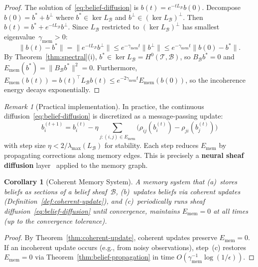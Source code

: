 \documentclass[11pt,a4paper]{article}
\theoremstyle{plain}
\newtheorem{corollary}[theorem]{Corollary}
\theoremstyle{definition}
\theoremstyle{remark}
\newtheorem{remark}[theorem]{Remark}
\newcommand{\cT}{\mathcal{T}}
\newcommand{\cB}{\mathcal{B}}
\begin{document}
\begin{proof}
The solution of~\eqref{eq:belief-diffusion} is $b(t) = e^{-tL_\cB}b(0)$. Decompose $b(0) = b^* + b^\perp$ where $b^* \in \ker L_\cB$ and $b^\perp \in (\ker L_\cB)^\perp$. Then $b(t) = b^* + e^{-tL_\cB}b^\perp$. Since $L_\cB$ restricted to $(\ker L_\cB)^\perp$ has smallest eigenvalue~$\gamma_{\mathrm{mem}} > 0$:
\[
\|b(t) - b^*\| = \|e^{-tL_\cB}b^\perp\| \leq e^{-\gamma_{\mathrm{mem}} t}\|b^\perp\| \leq e^{-\gamma_{\mathrm{mem}} t}\|b(0) - b^*\|.
\]
By Theorem~\ref{thm:spectral}(i), $b^* \in \ker L_\cB = H^0(\cT, \cB)$, so $B_\cB b^* = 0$ and $E_{\mathrm{mem}}(b^*) = \|B_\cB b^*\|^2 = 0$. Furthermore, $E_{\mathrm{mem}}(b(t)) = b(t)^\top L_\cB b(t) \leq e^{-2\gamma_{\mathrm{mem}} t} E_{\mathrm{mem}}(b(0))$, so the incoherence energy decays exponentially.
\end{proof}

\begin{remark}[Practical implementation]\label{rem:belief-practice}
In practice, the continuous diffusion~\eqref{eq:belief-diffusion} is discretized as a message-passing update:
\[
b_i^{(t+1)} = b_i^{(t)} - \eta \sum_{j: (i,j) \in E_{\mathrm{mem}}} \bigl(\rho_{ij}(b_i^{(t)}) - \rho_{ji}(b_j^{(t)})\bigr)
\]
with step size $\eta < 2/\lambda_{\max}(L_\cB)$ for stability. Each step reduces $E_{\mathrm{mem}}$ by propagating corrections along memory edges. This is precisely a \textbf{neural sheaf diffusion} layer~\citep{bodnar2022} applied to the memory graph.
\end{remark}

\begin{corollary}[Coherent Memory System]\label{cor:memory-system}
A memory system that (a)~stores beliefs as sections of a belief sheaf~$\cB$, (b)~updates beliefs via coherent updates (Definition~\ref{def:coherent-update}), and (c)~periodically runs sheaf diffusion~\eqref{eq:belief-diffusion} until convergence, maintains $E_{\mathrm{mem}} = 0$ at all times (up to the convergence tolerance).
\end{corollary}

\begin{proof}
By Theorem~\ref{thm:coherent-update}, coherent updates preserve $E_{\mathrm{mem}} = 0$. If an incoherent update occurs (e.g., from noisy observations), step~(c) restores $E_{\mathrm{mem}} = 0$ via Theorem~\ref{thm:belief-propagation} in time $O(\gamma_{\mathrm{mem}}^{-1}\log(1/\epsilon))$.
\end{proof}

\end{document}

